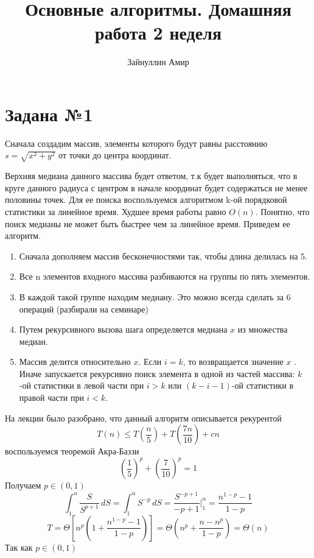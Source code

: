 \documentclass{article}
\begin{document}
\title{\textbf{Основные алгоритмы. Домашняя работа 2 неделя}}
\author{Зайнуллин Амир}
\maketitle

\section*{Задана №1}
    Сначала создадим массив, элементы которого будут равны расстоянию $s = \sqrt{x^2 + y^2}$ от точки до центра координат. \par 
    Верхняя медиана данного массива будет ответом, т.к будет выполняться, что в круге данного радиуса с центром в начале координат будет содержаться не менее половины точек. Для ее поиска воспользуемся алгоритмом k-ой порядковой статистики за линейное время. Худшее время работы равно $O(n)$. Понятно, что поиск медианы не может быть быстрее чем за линейное время.
    Приведем ее алгоритм.
    \begin{enumerate}
        \item Сначала дополняем массив бесконечностями так, чтобы длина делилась на 5.
        \item Все n элементов входного массива разбиваются на группы по пять элементов. 
        \item В каждой такой группе находим медиану. Это можно всегда сделать за 6 операций (разбирали на семинаре)
        \item Путем рекурсивного вызова шага определяется медиана $x$ из множества медиан.
        \item Массив делится относительно $x$. Если $i = k$, то возвращается значение $x$ . Иначе запускается рекурсивно поиск элемента в одной из частей массива: $k$-ой статистики в левой части при $i > k$  или $(k - i - 1)$-ой статистики в правой части при $i < k$.
    \end{enumerate}
    На лекции было разобрано, что данный алгоритм описывается рекурентой
    \[ T(n) \leqslant T\left(\dfrac{n}{5}\right) + T\left(\dfrac{7n}{10}\right) + cn \]
    воспользуемся теоремой Акра-Баззи
    \[ \left(\dfrac{1}{5}\right)^p + \left(\dfrac{7}{10}\right)^p = 1 \] Получаем $p \in (0, 1)$
    \[ \int_{1}^{n}  \dfrac{S}{S^{p + 1}}\,dS = \int_{1}^{n} S^{-p}\, dS = \dfrac{S^{-p + 1}}{-p + 1} \bigg|_1^n = \dfrac{n^{1 - p} - 1}{1 - p}\]
    \[ T = \Theta\left[ n^p\left(1 + \dfrac{n^{1 - p} - 1}{1 - p}\right)\right] = \Theta\left(n^p + \dfrac{n - n^p}{1 - p}\right) =  \Theta(n)\] Так как $p \in (0, 1)$
\end{document}
